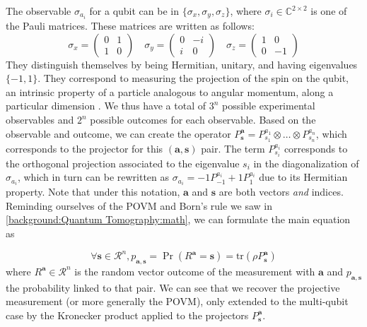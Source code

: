 \documentclass[12pt]{memoir}
\newcommand{\tr}{\text{tr}}
\newcommand{\mb}{\mathbf}
\newcommand{\ti}{\textit}
\begin{document}
The observable $\sigma_{a_i}$ for a qubit can be in $\{\sigma_x, \sigma_y, \sigma_z\}$, where $\sigma_i \in \mathbb{C}^{2 \times 2}$ is one of the Pauli matrices. These matrices are written as follows:
\begin{equation}
    \sigma_x  = \begin{pmatrix}
        0 & 1\\
        1 & 0
    \end{pmatrix}\quad
    \sigma_y = \begin{pmatrix}
        0 & -i\\
        i & 0
    \end{pmatrix}\quad
    \sigma_z = \begin{pmatrix}
        1 & 0\\
        0 & -1
    \end{pmatrix}
\end{equation}
They distinguish themselves by being Hermitian, unitary, and having eigenvalues $\{-1, 1\}$. They correspond to measuring the projection of the spin on the qubit, an intrinsic property of a particle analogous to angular momentum, along a particular dimension \cite{wiki:pauli-matrices}.
We thus have a total of $3^n$ possible experimental observables and $2^n$ possible outcomes for each observable. Based on the observable and outcome, we can create the operator $P^\mb a_{\mb s} = P^{a_1}_{s_1} \otimes \dots \otimes P^{a_n}_{s_n}$, which corresponds to the projector for this $(\mb a,\mb s)$ pair. The term $P^{a_i}_{s_i}$ corresponds to the orthogonal projection associated to the eigenvalue $s_i$ in the diagonalization of $\sigma_{a_i}$, which in turn can be rewritten as $\sigma_{a_i} = -1P^{a_i}_{-1} + 1P^{a_i}_1$ due to its Hermitian property. Note that under this notation, $\mb a$ and $\mb s$ are both vectors \ti{and} indices. Reminding ourselves of the POVM and Born's rule we saw in \ref{background:Quantum Tomography:math}, we can formulate the main equation as


\begin{equation}
    \forall \mb s \in \mathcal{R}^n, p_{\mb a,\mb s} = \Pr(R^{\mb a} = \mb s) = \tr(\rho P^{\mb a}_{\mb s})
\end{equation}
where $R^\mb{a} \in \mathcal{R}^n$ is the random vector outcome of the measurement with $\mb a$ and $p_{\mb a,\mb s}$ the probability linked to that pair. We can see that we recover the projective measurement (or more generally the POVM), only extended to the multi-qubit case by the Kronecker product applied to the projectors $P^{\mb a}_\mb{ s}$.\medbreak
\end{document}
